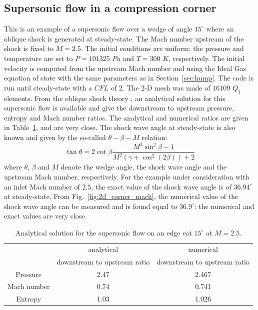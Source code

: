 \documentclass[preprint,10pt]{elsarticle}
\newcommand{\fig}[1]{Fig.~\ref{#1}}                      %
\newcommand{\tbl}[1]{Table~\ref{#1}}                     %
\newcommand{\sct}[1]{Section~\ref{#1}}                   %
\begin{document}
\subsection{Supersonic flow in a compression corner} \label{sec:corner}
This is an example of a supersonic flow over a wedge of angle $15^{\circ}$ where an oblique shock is generated at steady-state. The Mach number upstream of the shock is fixed to $M=2.5$. The initial conditions are uniform: the pressure and temperature are set to $P=101325$ $Pa$ and $T=300$ $K$, respectively. The initial velocity is computed from the upstream Mach number and using the Ideal Gas equation of state with the same parameters as in \sct{sec:hump}. The code is run until steady-state with a $CFL$ of $2$. The $2$-D mesh was made of $16109$ $Q_1$ elements. From the oblique shock theory \cite{CompressionCorner}, an analytical solution for this supersonic flow is available and give the downstream to upstream pressure, entropy and Mach number ratios. The analytical and numerical ratios are given in \tbl{tbl:corner_exact_sol}, and are very close. The shock wave angle at steady-state is also known and given by the so-called $\theta -\beta -M$ relation:
\begin{equation}
\tan \theta = 2 \cot \beta \frac{M^2 \sin^2 \beta -1}{M^2 \left(\gamma+\cos^2 (2\beta)\right)+2} \nonumber
\end{equation}
where $\theta$, $\beta$ and $M$ denote the wedge angle, the shock wave angle and the upstream Mach number, respectively. For the example under consideration with an inlet Mach number of $2.5$, the exact value of the shock wave angle is of $36.94^{\circ}$ at steady-state. From \fig{fig:2d_corner_mach}, the numerical value of the shock wave angle can be measured and is found equal to $36.9^{\circ}$: the numerical and exact values are very close.
\begin{table}[H]
\begin{center}
 \caption{\label{tbl:corner_exact_sol} Analytical solution for the supersonic flow on an edge eat $15^{\circ}$ at $M=2.5$.}
 \begin{tabular}{|c|c|c|}
 \hline
   & analytical & numerical \\
    & downstream to upstream ratio & downstream to upstream ratio \\
 \hline
Pressure & 2.47 & 2.467\\
  \hline
Mach number  &  0.74 & 0.741\\
   \hline
  Entropy & 1.03 & 1.026\\ 
  \hline 
\end{tabular}
\end{center}
\nonumber
\end{table}
\end{document}
